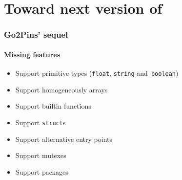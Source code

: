 \section{Toward next version of \gotopins}

\begin{frame}
  \frametitle{\textbf{Go2Pins}' sequel}
  \framesubtitle{Missing features}

  \begin{itemize}
    \item Support primitive types (\texttt{float}, \texttt{string} and\
      \texttt{boolean})
    \item Support homogeneously arrays
    \item Support builtin functions
    \item Support \texttt{struct}s
    \item Support alternative entry points
    \item Support mutexes
    \item Support packages
  \end{itemize}
\end{frame}
